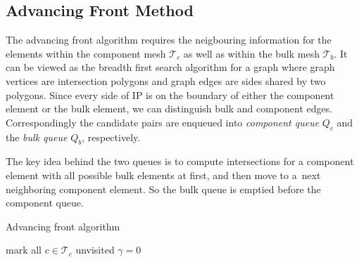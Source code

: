 \documentclass{elsarticle}
\newcommand{\noteJB}[1]{{\color{Blue} \textbf{JB: } \textit{#1}}}
\begin{document}
\subsection{Advancing Front Method}
\label{sec:front}
The advancing front algorithm requires the neigbouring information for the elements within the component mesh $\mathcal T_c$ 
as well as within the bulk mesh $\mathcal T_b$. It can be viewed as the breadth first search algorithm for a graph where graph vertices are 
intersection polygons and graph edges are sides shared by two polygons. Since every side of IP is on the boundary of either 
the component element or the bulk element, we can distinguish bulk and component edges. 
Correspondingly the candidate pairs are enqueued into \emph{component queue} $Q_c$ and the \emph{bulk queue} $Q_b$, respectively.

The key idea behind the two queues is to compute intersections for a component element with all possible bulk elements at first, and then move to a~next neighboring component element. So the bulk queue is emptied before the component queue.
\begin{algorithm}
  \caption{Advancing front algorithm}  
  \label{algo:advancing front}
  
  \DontPrintSemicolon
  mark all $c\in \mathcal T_c$ unvisited\;
  $\gamma=0$ 
  
\end{algorithm}
\end{document}

